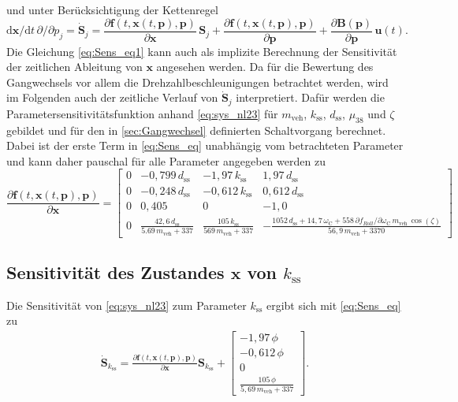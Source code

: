 und unter Berücksichtigung der Kettenregel
\begin{equation}\label{eq:Sens_eq}
\mathrm{d} \pmb{x}/\mathrm{d} t\,\partial/ \partial p_j = \dot{\pmb{S}}_j= \frac{\partial\pmb{f}(t,\pmb{x}(t,\pmb{p}),\pmb{p})}{\partial \pmb{x}}\,\pmb{S}_j+\frac{\partial\pmb{f}(t,\pmb{x}(t,\pmb{p}),\pmb{p})}{\partial \pmb{p}}+\frac{\partial \pmb{B}(\pmb{p})}{\partial \pmb{p}}\,\pmb{u}(t).
\end{equation}
Die Gleichung \eqref{eq:Sens_eq1} kann auch als implizite Berechnung der Sensitivität der zeitlichen Ableitung von $\pmb{x}$ angesehen werden. Da für die Bewertung des Gangwechsels vor allem die Drehzahlbeschleunigungen betrachtet werden, wird im Folgenden auch der zeitliche Verlauf von $\dot{\pmb{S}}_j$ interpretiert. Dafür werden die Parametersensitivitätsfunktion anhand \eqref{eq:sys_nl23} für $m_\mathrm{veh}$, $k_\mathrm{ss}$, $d_\mathrm{ss}$, $\mu_{38}$ und $\zeta$ gebildet und für den in \ref{sec:Gangwechsel} definierten Schaltvorgang berechnet. Dabei ist der erste Term in \eqref{eq:Sens_eq} unabhängig vom betrachteten Parameter und kann daher pauschal für alle Parameter angegeben werden zu
\begin{equation}
\frac{\partial\pmb{f}(t,\pmb{x}(t,\pmb{p}),\pmb{p})}{\partial \pmb{x}} = \begin{bmatrix} 0 & -0,799\,d_\mathrm{ss} & -1,97\,k_\mathrm{ss} & 1,97\,d_\mathrm{ss} \\  0 & -0,248\,d_\mathrm{ss} & -0,612\,k_\mathrm{ss} & 0,612\,d_\mathrm{ss} \\0 & 0,405 & 0 & -1,0 \\ 0 & \frac{42,6\,d_\mathrm{ss}}{5.69\,m_\mathrm{veh} + 337} & \frac{105\,k_\mathrm{ss}}{569\,m_\mathrm{veh}+337} & -\frac{1052\,d_\mathrm{ss} + 14,7\,\omega_\mathrm{C} + 558\,\partial f_{Roll}/\partial \omega_\mathrm{C}\,m_\mathrm{veh}\,\cos(\zeta)}{56,9\,m_\mathrm{veh} + 3370}\end{bmatrix}
\end{equation}

\subsection{Sensitivität des Zustandes $\pmb{x}$ von $k_\mathrm{ss}$}
Die Sensitivität von \eqref{eq:sys_nl23} zum Parameter $k_\mathrm{ss}$ ergibt sich mit \eqref{eq:Sens_eq} zu 
\begin{align}
\dot{\pmb{S}}_{k_\mathrm{ss}} = \frac{\partial\pmb{f}(t,\pmb{x}(t,\pmb{p}),\pmb{p})}{\partial \pmb{x}} \pmb{S}_{k_\mathrm{ss}} 
+ \begin{bmatrix} -1,97\,\phi \\ -0,612\,\phi \\ 0 \\ \frac{105\,\phi}{5,69\,m_\mathrm{veh} + 337} \end{bmatrix}.
\end{align}

